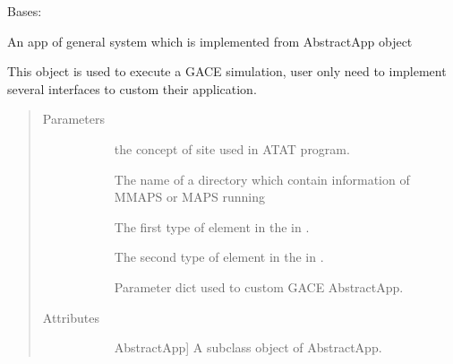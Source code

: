 \documentclass[letterpaper,10pt,english]{sphinxmanual}
\begin{document}
\begin{fulllineitems}
\label{\detokenize{pygace:pygace.general_gace.GeneralApp}}
\sphinxAtStartPar
Bases: {\hyperref[\detokenize{pygace:pygace.gace.AbstractApp}]{}}

\sphinxAtStartPar
An app of general system which is implemented from AbstractApp object

\sphinxAtStartPar
This object is used to execute a GACE simulation, user only need to
implement several interfaces to custom their application.
\begin{quote}\begin{description}
\item[{Parameters}] \leavevmode\begin{description}
\item[{}] \leavevmode
\sphinxAtStartPar
the concept of site used in ATAT program.

\item[{}] \leavevmode
\sphinxAtStartPar
The name of a directory which contain information of MMAPS or MAPS
running

\item[{}] \leavevmode
\sphinxAtStartPar
The first type of element in the  in .

\item[{}] \leavevmode
\sphinxAtStartPar
The second type of element in the  in .

\item[{}] \leavevmode
\sphinxAtStartPar
Parameter dict used to custom GACE AbstractApp.

\end{description}

\item[{Attributes}] \leavevmode\begin{description}
\item[{}] \leavevmode{[}AbstractApp{]}
\sphinxAtStartPar
A subclass object of AbstractApp.


\end{description}
\end{description}
\end{quote}
\end{fulllineitems}
\end{document}
